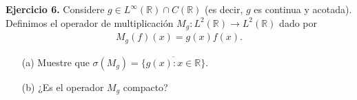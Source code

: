 \textbf{Ejercicio 6.} Considere $g\in L^\infty(\mathbb{R})\cap C(\mathbb{R})$ (es decir, $g$ es continua y acotada). Definimos el operador de multiplicación $M_g:L^2(\mathbb{R})\to L^2(\mathbb{R})$ dado por
\begin{align*}
    M_g(f)(x)=g(x)f(x).
\end{align*}
\begin{enumerate}
    \item[(a)] Muestre que $\sigma(M_g)=\overline{\{g(x):x\in \mathbb{R}\}}$.
    \item[(b)] ¿Es el operador $M_g$ compacto?
\end{enumerate}
